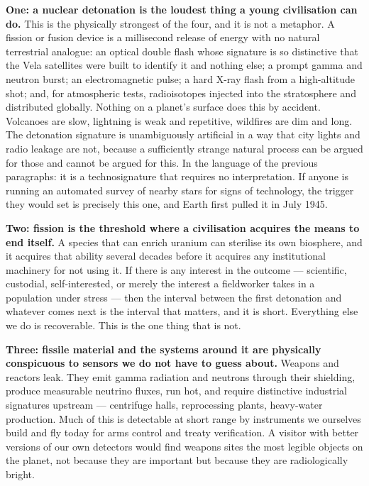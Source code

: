 \textbf{One: a nuclear detonation is the loudest thing a young civilisation can do.} This is the
physically strongest of the four, and it is not a metaphor. A fission or fusion device is a
millisecond release of energy with no natural terrestrial analogue: an optical double flash whose
signature is so distinctive that the Vela satellites were built to identify it and nothing else; a
prompt gamma and neutron burst; an electromagnetic pulse; a hard X-ray flash from a high-altitude
shot; and, for atmospheric tests, radioisotopes injected into the stratosphere and distributed
globally. Nothing on a planet's surface does this by accident. Volcanoes are slow, lightning is
weak and repetitive, wildfires are dim and long. The detonation signature is unambiguously
artificial in a way that city lights and radio leakage are not, because a sufficiently strange
natural process can be argued for those and cannot be argued for this. In the language of the
previous paragraphs: it is a technosignature that requires no interpretation. If anyone is running
an automated survey of nearby stars for signs of technology, the trigger they would set is
precisely this one, and Earth first pulled it in July 1945.

\textbf{Two: fission is the threshold where a civilisation acquires the means to end itself.} A
species that can enrich uranium can sterilise its own biosphere, and it acquires that ability
several decades before it acquires any institutional machinery for not using it. If there is any
interest in the outcome --- scientific, custodial, self-interested, or merely the interest a
fieldworker takes in a population under stress --- then the interval between the first detonation
and whatever comes next is the interval that matters, and it is short. Everything else we do is
recoverable. This is the one thing that is not.

\textbf{Three: fissile material and the systems around it are physically conspicuous to sensors we
do not have to guess about.} Weapons and reactors leak. They emit gamma radiation and neutrons
through their shielding, produce measurable neutrino fluxes, run hot, and require distinctive
industrial signatures upstream --- centrifuge halls, reprocessing plants, heavy-water production.
Much of this is detectable at short range by instruments we ourselves build and fly today for arms
control and treaty verification. A visitor with better versions of our own detectors would find
weapons sites the most legible objects on the planet, not because they are important but because
they are radiologically bright.

